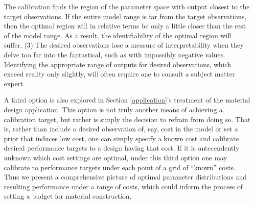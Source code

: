 \documentclass{article}
\begin{document}
%
The calibration finds the region of the parameter space with output closest to the target observations.
%
If the entire model range is far from the target observations, then the optimal region will in relative terms be only a little closer than the rest of the model range. 
% 
As a result, the identifiability of the optimal region will suffer.
%
%
(3) The desired observations lose a measure of interpretability when they delve too far into the fantastical, such as with impossibly negative values. 
%
Identifying the appropriate range of outputs for desired observations, which exceed reality only slightly, will often require one to consult a subject matter expert. 


A third option is also explored in Section \ref{application}'s treatment of the material design application. 
%
This option is not truly another means of achieving a calibration target, but rather is simply the decision to refrain from doing so. 
%
That is, rather than include a desired observation of, say, cost in the model or set a prior that induces low cost, one can simply specify a known cost and calibrate desired performance targets to a design having that cost. 
%
If it is antecendently unknown which cost settings are optimal, under this third option one may calibrate to performance targets under each point of a grid of ``known'' costs. 
%
Thus we present a comprehensive picture of optimal parameter distributions and resulting performance under a range of costs, which could inform the process of setting a budget for material construction.
\end{document}
